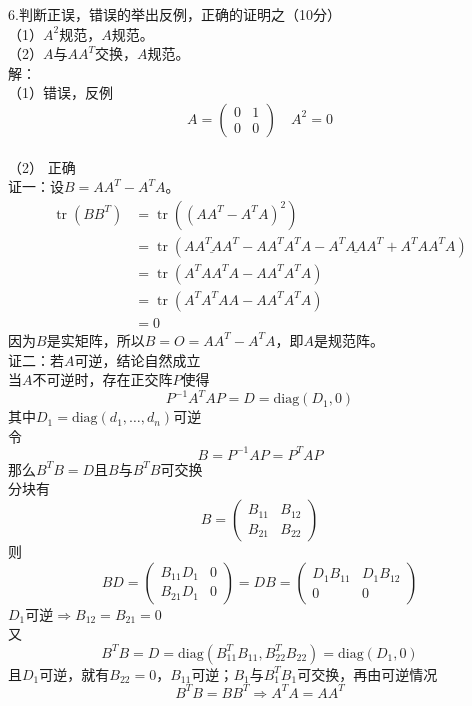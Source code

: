 \documentclass[UTF8]{ctexart}
\begin{document}
\noindent 6.判断正误，错误的举出反例，正确的证明之（10分）\\
（1）$A^2$规范，$A$规范。\\
（2）$A$与$AA^T$交换，$A$规范。\\
解：\\
（1）错误，反例$$A = \begin{pmatrix} 0 & 1 \\ 0 & 0 \end{pmatrix}\quad A^2 = 0$$\\
（2） 正确\\
证一：设$B = AA^T - A^TA$。
\[
\begin{aligned}
	\operatorname{tr}\left(B B^T\right) & =\operatorname{tr}\left(\left(A A^T-A^T A\right)^2\right) \\
	& =\operatorname{tr}\left(\underline{A A^T A A^T}-A A^T A^T A-\underline{A^T A A A^T}+A^T A A^T A\right) \\
	& =\operatorname{tr}\left(A^T A A^T A-A A^T A^T A\right) \\
	& =\operatorname{tr}\left(A^T A^T A A-A A^T A^T A\right) \\
	& =0
\end{aligned}
\]
因为$B$是实矩阵，所以$B = O = AA^T - A^TA$，即$A$是规范阵。\\
证二：若$A$可逆，结论自然成立\\
当$A$不可逆时，存在正交阵$P$使得
$$P^{-1}A^TAP = D = \text{diag}(D_1, 0)$$
其中$D_1 = \text{diag}(d_1, \ldots, d_n)$可逆\\
令
$$B = P^{-1}AP = P^TAP$$
那么$B^TB = D$且$B$与$B^TB$可交换\\
分块有
$$B = \begin{pmatrix} B_{11} & B_{12} \\ B_{21} & B_{22} \end{pmatrix}$$
则
$$BD = \begin{pmatrix} B_{11}D_1 & 0 \\ B_{21}D_1 & 0 \end{pmatrix} = DB = \begin{pmatrix} D_1B_{11} & D_1B_{12} \\ 0 & 0 \end{pmatrix}$$
$D_1$可逆$\Rightarrow B_{12} = B_{21} = 0$\\
又
$$B^TB = D = \text{diag}(B_{11}^TB_{11}, B_{22}^TB_{22}) = \text{diag}(D_1, 0)$$
且$D_1$可逆，就有$ B_{22} = 0$，$B_{11}$可逆；$B_1$与$B_1^TB_1$可交换，再由可逆情况
$$ B^TB = BB^T \Rightarrow A^TA = AA^T$$\\
		
\end{document}
